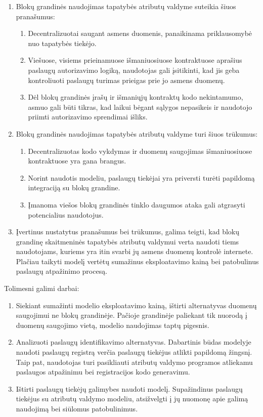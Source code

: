 \renewcommand{\labelenumii}{\arabic{enumii}.}
\begin{enumerate}
    \item Blokų grandinės naudojimas tapatybės atributų valdyme suteikia šiuos pranašumus:
    \begin{enumerate}
        \item Decentralizuotai saugant asmens duomenis,
        panaikinama priklausomybė nuo tapatybės tiekėjo.
        \item Viešuose, visiems prieinamuose
        išmaniuosiuose kontraktuose aprašius paslaugų autorizavimo logiką, naudotojas gali įsitikinti,
        kad jis geba kontroliuoti paslaugų turimas prieigas prie jo asmens duomenų.
        \item Dėl blokų grandinės įrašų ir išmaniųjų kontraktų kodo
        nekintamumo, asmuo gali būti tikras, kad laikui bėgant sąlygos nepasikeis ir naudotojo priimti
        autorizavimo sprendimai išliks.
    \end{enumerate}
    \item Blokų grandinės naudojimas tapatybės atributų valdyme turi šiuos trūkumus:
    \begin{enumerate}
        \item Decentralizuotas kodo vykdymas ir duomenų saugojimas išmaniuosiuose kontraktuose yra gana brangus.
        \item Norint naudotis modeliu, paslaugų tiekėjai yra priversti turėti papildomą integraciją su blokų grandine.
        \item Įmanoma viešos blokų grandinės tinklo daugumos ataka gali atgrasyti potencialius naudotojus.
    \end{enumerate}
    \item Įvertinus nustatytus pranašumus bei trūkumus, galima teigti, kad blokų grandinę skaitmeninės tapatybės atributų valdymui verta naudoti
    tiems naudotojams, kuriems yra itin svarbi jų asmens duomenų kontrolė internete. Plačiau taikyti modelį vertėtų
    sumažinus eksploatavimo kainą bei patobulinus paslaugų atpažinimo procesą.
\end{enumerate}

\hfill \break
Tolimesni galimi darbai:

\begin{enumerate}
    \item Siekiant sumažinti modelio eksploatavimo kainą, ištirti alternatyvas duomenų saugojimui ne blokų grandinėje. Pačioje grandinėje
    paliekant tik nuorodą į duomenų saugojimo vietą, modelio naudojimas taptų pigesnis.
    \item Analizuoti paslaugų identifikavimo alternatyvas. Dabartinis būdas modelyje naudoti paslaugų registrą verčia paslaugų tiekėjus atlikti
    papildomą žingsnį. Taip pat, naudotojas turi pasikliauti atributų valdymo programos atliekamu paslaugos atpažinimu bei registracijos kodo generavimu.
    \item Ištirti paslaugų tiekėjų galimybes naudoti modelį. Supažindinus paslaugų tiekėjus su atributų valdymo modeliu,
    atsižvelgti į jų nuomonę apie galimą naudojimą bei siūlomus patobulinimus.
\end{enumerate}